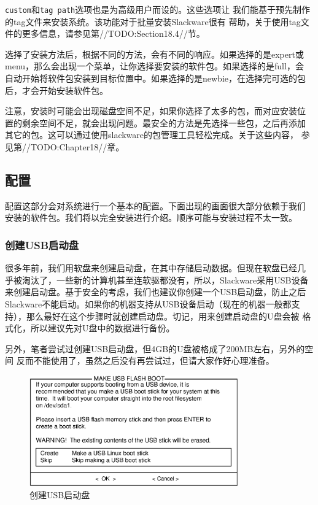 \texttt{custom}和\texttt{tag path}选项也是为高级用户而设的。这些选项让
我们能基于预先制作的tag文件来安装系统。该功能对于批量安装Slackware很有
帮助，关于使用tag文件的更多信息，请参见第//TODO:Section18.4//节。

选择了安装方法后，根据不同的方法，会有不同的响应。如果选择的是expert或
menu，那么会出现一个菜单，让你选择要安装的软件包。如果选择的是full，会
自动开始将软件包安装到目标位置中。如果选择的是newbie，在选择完可选的包
后，才会开始安装软件包。

注意，安装时可能会出现磁盘空间不足，如果你选择了太多的包，而对应安装位
置的剩余空间不足，就会出现问题。最安全的方法是先选择一些包，之后再添加
其它的包。这可以通过使用slackware的包管理工具轻松完成。关于这些内容，
参见第//TODO:Chapter18//章。

\subsection{配置}
\label{sec:installation:setup:configure}

配置这部分会对系统进行一个基本的配置。下面出现的画面很大部分依赖于我们
安装的软件包。我们将以完全安装进行介绍。顺序可能与安装过程不太一致。
\subsubsection{创建USB启动盘}
\label{sec:installation:setup:configure:usbdisk}
很多年前，我们用软盘来创建启动盘，在其中存储启动数据。但现在软盘已经几
乎被淘汰了，一些新的计算机甚至连软驱都没有，所以，Slackware采用USB设备
来创建启动盘。基于安全的考虑，我们也建议你创建一个USB启动盘，防止之后
Slackware不能启动。如果你的机器支持从USB设备启动（现在的机器一般都支
持），那么最好在这个步骤时就创建启动盘。切记，用来创建启动盘的U盘会被
格式化，所以建议先对U盘中的数据进行备份。

另外，笔者尝试过创建USB启动盘，但4GB的U盘被格成了200MB左右，另外的空间
反而不能使用了，虽然之后没有再尝试过，但请大家作好心理准备。

\begin{figure}[htpb]
  \centering
  \includegraphics[width=0.8\textwidth]{images/installation/usb-boot-stick.eps}
  \caption{创建USB启动盘}
  \label{fig:usb-boot-stick}
\end{figure}

